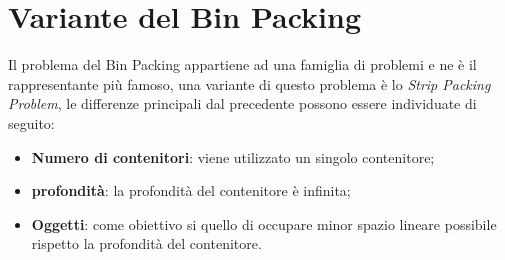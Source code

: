 \section{Variante del Bin Packing}
Il problema del Bin Packing appartiene ad una famiglia di problemi e ne è il rappresentante più famoso, una variante di questo problema è lo \textit{Strip Packing Problem}, le differenze principali dal precedente possono essere individuate di seguito:
\begin{itemize}
    \item \textbf{Numero di contenitori}: viene utilizzato un singolo contenitore;
    \item \textbf{profondità}: la profondità del contenitore è infinita;
    \item \textbf{Oggetti}: come obiettivo si quello di occupare minor spazio lineare possibile rispetto la profondità del contenitore.
\end{itemize}

